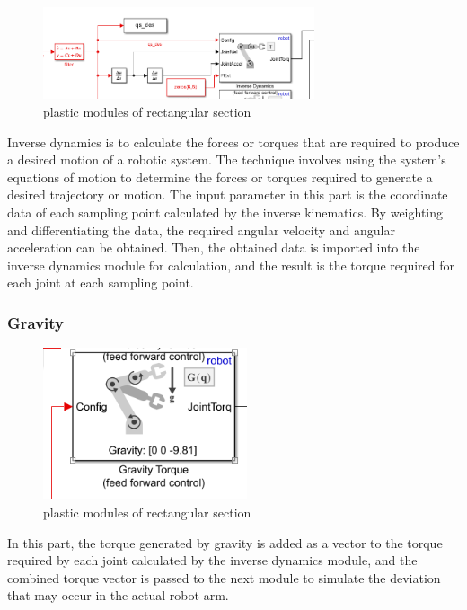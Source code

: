 \begin{figure}[htbp]
    \centering
    \includegraphics[width=8cm]{./fig/ID.png}
    \caption{plastic modules of rectangular section  }
    \label{f1}
\end{figure}

Inverse dynamics is to calculate the forces or torques that are required to produce a desired motion of a robotic system. The technique involves using the system's equations of motion to determine the forces or torques required to generate a desired trajectory or motion. The input parameter in this part is the coordinate data of each sampling point calculated by the inverse kinematics. By weighting and differentiating the data, the required angular velocity and angular acceleration can be obtained. Then, the obtained data is imported into the inverse dynamics module for calculation, and the result is the torque required for each joint at each sampling point.


\subsubsection*{Gravity}

\begin{figure}[htbp]
    \centering
    \includegraphics[width=6cm]{./fig/G.png}
    \caption{plastic modules of rectangular section  }
    \label{f1}
\end{figure}

In this part, the torque generated by gravity is added as a vector to the torque required by each joint calculated by the inverse dynamics module, and the combined torque vector is passed to the next module to simulate the deviation that may occur in the actual robot arm.



